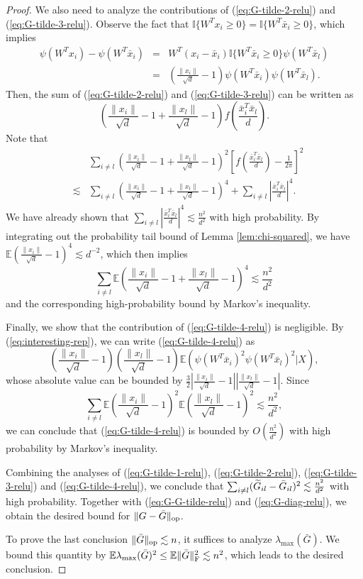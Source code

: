 \begin{proof}
We also need to analyze the contributions of (\ref{eq:G-tilde-2-relu}) and (\ref{eq:G-tilde-3-relu}). Observe the fact that $\mathbb{I}\{W^Tx_i\geq 0\}=\mathbb{I}\{W^T\bar{x}_i\geq 0\}$, which implies
\begin{eqnarray}
\nonumber \psi(W^Tx_i)-\psi(W^T\bar{x}_i) &=& W^T(x_i-\bar{x}_i)\mathbb{I}\{W^T\bar{x}_i\geq 0\}\psi(W^T\bar{x}_l) \\
\label{eq:interesting-rep} &=& \left(\frac{\|x_i\|}{\sqrt{d}}-1\right)\psi(W^T\bar{x}_i)\psi(W^T\bar{x}_l).
\end{eqnarray}
Then, the sum of (\ref{eq:G-tilde-2-relu}) and (\ref{eq:G-tilde-3-relu}) can be written as
$$\left(\frac{\|x_i\|}{\sqrt{d}}-1+\frac{\|x_l\|}{\sqrt{d}}-1\right)f\left(\frac{\bar{x}_i^T\bar{x}_l}{d}\right).$$
Note that
\begin{eqnarray*}
&& \sum_{i\neq l} \left(\frac{\|x_i\|}{\sqrt{d}}-1+\frac{\|x_l\|}{\sqrt{d}}-1\right)^2\left[f\left(\frac{\bar{x}_i^T\bar{x}_l}{d}\right)-\frac{1}{2\pi}\right]^2 \\
&\lesssim& \sum_{i\neq l} \left(\frac{\|x_i\|}{\sqrt{d}}-1+\frac{\|x_l\|}{\sqrt{d}}-1\right)^4 + \sum_{i\neq l}\left|\frac{\bar{x}_i^T\bar{x}_l}{d}\right|^4.
\end{eqnarray*}
We have already shown that $\sum_{i\neq l}\left|\frac{\bar{x}_i^T\bar{x}_l}{d}\right|^4\lesssim \frac{n^2}{d^2}$ with high probability. By integrating out the probability tail bound of Lemma \ref{lem:chi-squared}, we have $\mathbb{E}\left(\frac{\|x_i\|}{\sqrt{d}}-1\right)^4\lesssim d^{-2}$, which then implies
$$\sum_{i\neq l} \mathbb{E}\left(\frac{\|x_i\|}{\sqrt{d}}-1+\frac{\|x_l\|}{\sqrt{d}}-1\right)^4\lesssim \frac{n^2}{d^2}$$
and the corresponding high-probability bound by Markov's inequality.

Finally, we show that the contribution of (\ref{eq:G-tilde-4-relu}) is negligible. By (\ref{eq:interesting-rep}), we can write (\ref{eq:G-tilde-4-relu}) as
$$\left(\frac{\|x_i\|}{\sqrt{d}}-1\right)\left(\frac{\|x_l\|}{\sqrt{d}}-1\right)\mathbb{E}\left(\psi(W^T\bar{x}_i)^2\psi(W^T\bar{x}_l)^2\Big|X\right),$$
whose absolute value can be bounded by $\frac{3}{2}\left|\frac{\|x_i\|}{\sqrt{d}}-1\right|\left|\frac{\|x_l\|}{\sqrt{d}}-1\right|$. Since
$$\sum_{i\neq l}\mathbb{E}\left(\frac{\|x_i\|}{\sqrt{d}}-1\right)^2\mathbb{E}\left(\frac{\|x_l\|}{\sqrt{d}}-1\right)^2\lesssim \frac{n^2}{d^2},$$
we can conclude that (\ref{eq:G-tilde-4-relu}) is bounded by $O\left(\frac{n^2}{d^2}\right)$ with high probability by Markov's inequality.

Combining the analyses of (\ref{eq:G-tilde-1-relu}), (\ref{eq:G-tilde-2-relu}), (\ref{eq:G-tilde-3-relu}) and (\ref{eq:G-tilde-4-relu}), we conclude that $\sum_{i\neq l}(\widetilde{G}_{il}-\bar{G}_{il})^2\lesssim \frac{n^2}{d^2}$ with high probability. Together with (\ref{eq:G-G-tilde-relu}) and (\ref{eq:G-diag-relu}), we obtain the desired bound for $\|G-\bar{G}\|_{\rm op}$.

To prove the last conclusion $\|\bar{G}\|_{\rm op}\lesssim n$, it suffices to analyze $\lambda_{\max}(\bar{G})$. We bound this quantity by $\mathbb{E}\lambda_{\max}(\bar{G})^2\leq \mathbb{E}\|\bar{G}\|_{\rm F}^2\lesssim n^2$, which leads to the desired conclusion.
\end{proof}


